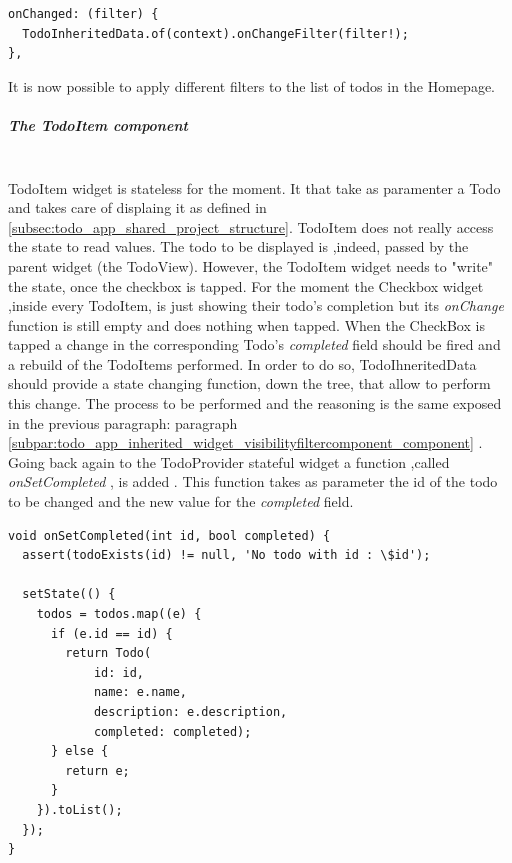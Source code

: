 \begin{verbatim}
onChanged: (filter) {
  TodoInheritedData.of(context).onChangeFilter(filter!);
},
\end{verbatim}

It is now possible to apply different filters to the list of todos in the Homepage. 


\subparagraph{The TodoItem component}\mbox{}\\
\label{subpar:todo_app_inherited_widget_todoitem_component}
TodoItem widget is stateless for the moment. It that take as paramenter a Todo and takes care of displaing it as defined in \ref{subsec:todo_app_shared_project_structure}. TodoItem does not really access the state to read values. The todo to be displayed is ,indeed, passed by the parent widget (the TodoView). However, the TodoItem widget needs to "write" the state, once the checkbox is tapped. For the moment the Checkbox widget ,inside every TodoItem, is just showing their  todo's completion but its \textit{onChange   }function is still empty and does nothing when tapped. When the CheckBox is tapped a change in the corresponding Todo’s \textit{completed }field should be fired and a rebuild of the TodoItems performed. In order to do so, TodoIhneritedData should provide a state changing function, down the tree, that allow to perform this change. The process to be performed and the reasoning is the same exposed in the previous paragraph: paragraph \ref{subpar:todo_app_inherited_widget_visibilityfiltercomponent_component} . Going back again to the TodoProvider stateful widget a function ,called \textit{onSetCompleted  }, is added . This function takes as parameter the id of the todo to be changed and the new value for the \textit{completed }field.
\mbox{}\\



\begin{verbatim}
void onSetCompleted(int id, bool completed) {
  assert(todoExists(id) != null, 'No todo with id : \$id');

  setState(() {
    todos = todos.map((e) {
      if (e.id == id) {
        return Todo(
            id: id,
            name: e.name,
            description: e.description,
            completed: completed);
      } else {
        return e;
      }
    }).toList();
  });
}
\end{verbatim}

